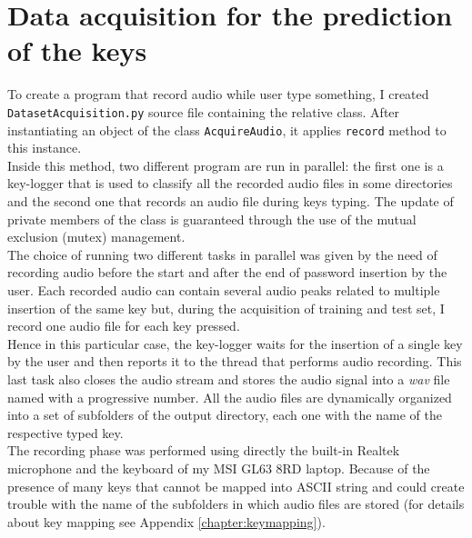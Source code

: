 \section{Data acquisition for the prediction of the keys}
To create a program that record audio while user type something, I created \texttt{DatasetAcquisition.py} source file containing the relative class. After instantiating an object of the class \texttt{AcquireAudio}, it applies \texttt{record} method to this instance.\\
Inside this method, two different program are run in parallel: the first one is a key-logger that is used to classify all the recorded audio files in some directories and the second one that records an audio file during keys typing. The update of private members of the class is guaranteed through the use of the mutual exclusion (mutex) management.\\
The choice of running two different tasks in parallel was given by the need of recording audio before the start and after the end of password insertion by the user. Each recorded audio can contain several audio peaks related to multiple insertion of the same key but, during the acquisition of training and test set, I record one audio file for each key pressed.\\
Hence in this particular case, the key-logger waits for the insertion of a single key by the user and then reports it to the thread that performs audio recording. This last task also closes the audio stream and stores the audio signal into a \textit{wav} file named with a progressive number. All the audio files are dynamically organized into a set of subfolders of the output directory, each one with the name of the respective typed key.\\
The recording phase was performed using directly the built-in Realtek microphone and the keyboard of my MSI GL63 8RD laptop. 
Because of the presence of many keys that cannot be mapped into ASCII string and could create trouble with the name of the subfolders in which audio files are stored (for details about key mapping see Appendix \ref{chapter:keymapping}).
